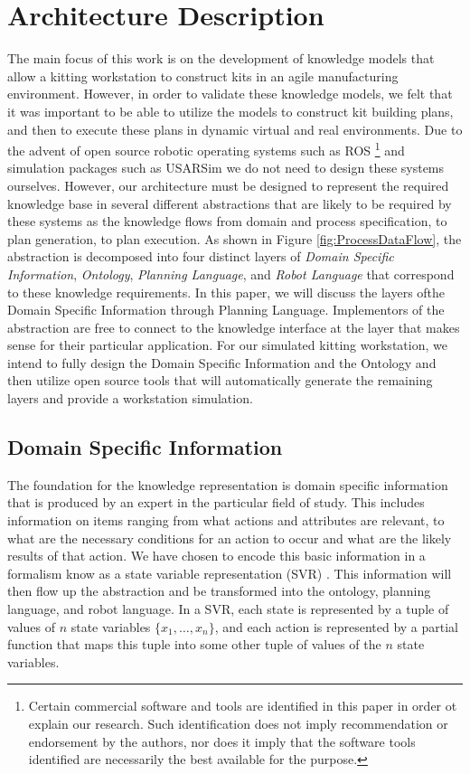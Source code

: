 \section{Architecture Description}
\label{sect:Architecture}
The main focus of this work is on the development of knowledge models that allow a kitting workstation to construct kits
in an agile manufacturing environment. However, in order to validate these knowledge models, we felt that it was
important to be able to utilize the models to construct kit building plans, and then to execute these plans in dynamic
virtual and real environments. Due to the advent of open source robotic operating systems such as ROS \cite{ROS}
 \footnote{Certain commercial software and tools are identified in this paper in order ot explain our research. Such identification does not imply
recommendation or endorsement by the authors, nor does it imply that the software tools identified are necessarily the best available for the purpose.}
 and simulation
packages such as USARSim \cite{Balakirsky2007} we do not need to design these systems ourselves. However, our architecture must
be designed to represent the required knowledge base in several different abstractions that are likely to be
required by these systems as the knowledge flows from domain and process specification, to plan generation, to plan execution.
As shown in Figure \ref{fig:ProcessDataFlow}, the abstraction is decomposed into four
distinct layers of {\it Domain Specific Information}, {\it Ontology}, {\it Planning Language}, and {\it Robot Language} that correspond to these
knowledge requirements. In this paper, we will discuss the layers ofthe Domain Specific Information through Planning Language. Implementors of the abstraction are free to connect to the knowledge interface at the layer that makes sense for
their particular application. For our simulated kitting workstation, we intend to fully design the Domain Specific Information and the Ontology and
then utilize open
source tools that will automatically generate the remaining layers and provide a workstation simulation.

\subsection{Domain Specific Information}
\label{subsect:DomainSpecific}
The foundation for the knowledge representation is domain specific information that is produced by an expert in the particular field of study. This includes
information on items ranging from what actions and attributes are relevant, to what are the necessary conditions for an action to occur and what are the
likely results of that action. We have chosen to encode this basic information in a formalism know as a state variable representation (SVR) \cite{NAU.2004}.
This information will then flow up the abstraction and be transformed into the ontology, planning language, and robot language.
In a SVR, each state is represented by a tuple of values of $n$ state variables $\lbrace x_1,\dots,x_n\rbrace$, and each action is represented by a partial function that maps this tuple into some other tuple of values of the $n$ state variables.

